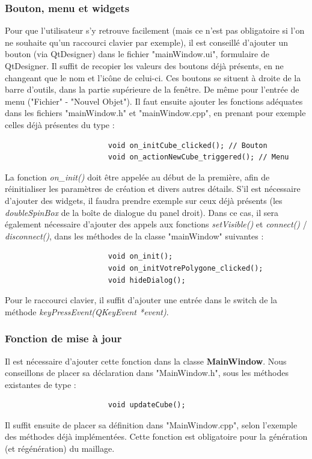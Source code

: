 \documentclass[a4paper]{memoir}
\begin{document}
				\subsubsection{Bouton, menu et widgets}
					Pour que l'utilisateur s'y retrouve facilement (mais ce n'est pas obligatoire si l'on ne souhaite qu'un raccourci clavier par exemple), 
					il est conseillé d'ajouter un bouton (via QtDesigner) dans le fichier "mainWindow.ui", formulaire de QtDesigner. Il suffit de recopier 
					les valeurs des boutons déjà présents, en ne changeant que le nom et l'icône de celui-ci. Ces boutons se situent à droite de la barre 
					d'outils, dans la partie supérieure de la fenêtre. De même pour l'entrée de menu ("Fichier" - "Nouvel Objet"). Il faut ensuite ajouter 
					les fonctions adéquates dans les fichiers "mainWindow.h" et "mainWindow.cpp", en prenant pour exemple celles déjà présentes du type :
					\begin{verbatim}
						void on_initCube_clicked(); // Bouton
						void on_actionNewCube_triggered(); // Menu
					\end{verbatim}
					La fonction \textit{on\_init()} doit être appelée au début de la première, afin de réinitialiser les paramètres de création et divers 
					autres détails. S'il est nécessaire d'ajouter des widgets, il faudra prendre exemple sur ceux déjà présents (les \textit{doubleSpinBox} 
					de la boîte de dialogue du panel droit). Dans ce cas, il sera également nécessaire d'ajouter des appels aux fonctions 
					\textit{setVisible()} et \textit{connect()} / \textit{disconnect()}, dans les méthodes de la classe "mainWindow" suivantes :
					\begin{verbatim}
						void on_init();
						void on_initVotrePolygone_clicked();
						void hideDialog();
					\end{verbatim}
					Pour le raccourci clavier, il suffit d'ajouter une entrée dans le switch de la méthode \textit{keyPressEvent(QKeyEvent *event)}.
					
				\subsubsection{Fonction de mise à jour}
					Il est nécessaire d'ajouter cette fonction dans la classe \textbf{MainWindow}. Nous conseillons de placer sa déclaration dans 
					"MainWindow.h", sous les méthodes existantes de type :
					\begin{verbatim}
						void updateCube();
					\end{verbatim}
					Il suffit ensuite de placer sa définition dans "MainWindow.cpp", selon l'exemple des méthodes déjà implémentées. Cette fonction est 
					obligatoire pour la génération (et régénération) du maillage.
				
\end{document}
